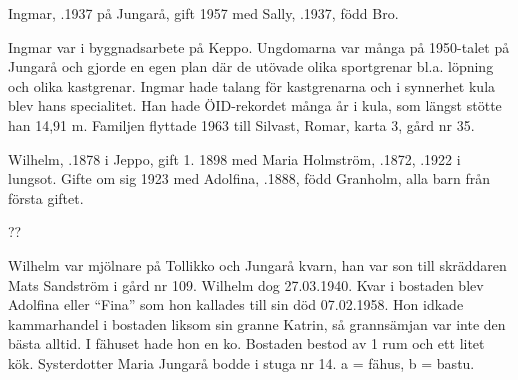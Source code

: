 Ingmar, .1937 på Jungarå, gift 1957 med Sally, .1937, född Bro.
\begin{jhchildren}
  \item {}
  \item {}
  \item {}
  \item {}
  \item {}
\end{jhchildren}
Ingmar var i byggnadsarbete på Keppo. Ungdomarna var många på 1950-talet på Jungarå och gjorde en egen plan där de utövade olika sportgrenar bl.a. löpning och olika kastgrenar. Ingmar hade talang för kastgrenarna och i synnerhet kula blev hans specialitet. Han hade ÖID-rekordet många år i kula, som längst stötte han 14,91 m. Familjen flyttade 1963 till Silvast, Romar, karta 3, gård nr 35.


Wilhelm, .1878 i Jeppo, gift 1. 1898 med Maria Holmström, .1872, .1922 i lungsot. Gifte om sig 1923 med Adolfina, .1888, född Granholm, alla barn från första giftet.
\begin{jhchildren}
  \item {}
  \item {}
  \item {}
  \item {}
  \item {} ??
  \item {}
\end{jhchildren}
Wilhelm var mjölnare på Tollikko och Jungarå kvarn, han var son till skräddaren Mats Sandström i gård nr 109. Wilhelm dog 27.03.1940. Kvar i bostaden blev Adolfina eller ``Fina'' som hon kallades till sin död 07.02.1958. Hon idkade kammarhandel i bostaden liksom sin granne Katrin, så grannsämjan var inte den bästa alltid. I fähuset hade hon en ko. Bostaden bestod av 1 rum och ett litet kök. Systerdotter Maria Jungarå bodde i stuga nr 14. a = fähus, b = bastu.



